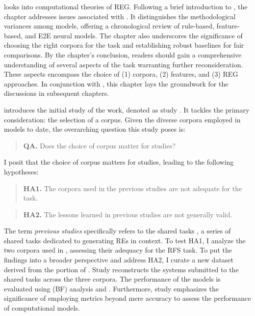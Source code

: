  looks into computational theories of REG. Following a brief introduction to \shot, the chapter addresses issues associated with \context. It distinguishes the methodological variances among \context models, offering a chronological review of rule-based, feature-based, and E2E neural models. The chapter also underscores the significance of choosing the right corpora for the task and establishing robust baselines for fair comparisons. By the chapter's conclusion, readers should gain a comprehensive understanding of several aspects of the \context task warranting further reconsideration. These aspects encompass the choice of (1) corpora, (2) features, and (3) REG approaches. In conjunction with , this chapter lays the groundwork for the discussions in subsequent chapters.

 introduces the initial study of the work, denoted as study \studA. It tackles the primary \context consideration: the selection of a corpus. Given the diverse corpora employed in \context models to date, the overarching question this study poses is: 

\begin{quote}
	\textbf{QA.} Does the choice of corpus matter for \context studies?
\end{quote}

I posit that the choice of corpus matters for \context studies, leading to the following hypotheses:

\begin{quote}
	\textbf{HA1.} The corpora used in the previous \context studies are not adequate for the task.
\end{quote}

\begin{quote}
	\textbf{HA2.} The lessons learned in previous \context studies are not generally valid.
\end{quote}
	
The term \emph{previous \context studies} specifically refers to the  shared tasks \citep{belz2010generating}, a series of shared tasks dedicated to generating REs in context. To test HA1, I analyze the two corpora used in \grec, assessing their adequacy for the RFS task. To put the findings into a broader perspective and address HA2, I curate a new dataset derived from the \wsj portion of \onto. Study \studA reconstructs the systems submitted to the \grec shared tasks across the three corpora. The performance of the models is evaluated using  (BF) analysis and . Furthermore, study \studA emphasizes the significance of employing metrics beyond mere accuracy to assess the performance of computational models.


